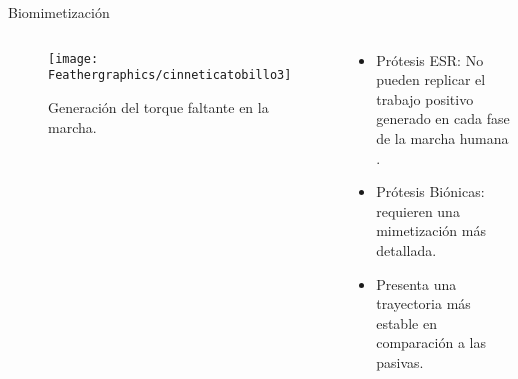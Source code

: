 \documentclass[10pt]{beamer}
\begin{document}
\begin{frame}{Biomimetización}

\begin{columns}[t]


\column{65 mm}
\begin{block}{}
{\footnotesize{}}

\begin{figure}
\begin{centering}
\texttt{[image: Feathergraphics/cinneticatobillo3]}
\par\end{centering}
\caption{{\scriptsize{}Generación del torque faltante en la marcha. \cite{Au2009} }}
\end{figure}

\end{block}

\column{50 mm}
\begin{exampleblock}{}

\begin{itemize}
\item {\footnotesize{}Prótesis ESR: No pueden replicar el trabajo positivo
generado en cada fase de la marcha humana \cite{Esposito2015}.}{\footnotesize \par}
\end{itemize}
\vspace{2 mm}
\begin{itemize}
\item {\footnotesize{}Prótesis Biónicas: requieren una mimetización más
detallada\cite{Hill2013a}.}{\footnotesize \par}
\end{itemize}
\vspace{2 mm}
\begin{itemize}
\item {\footnotesize{}Presenta una trayectoria más estable en comparación
a las pasivas\cite{Hill2013a}.}{\footnotesize \par}
\end{itemize}
\end{exampleblock}
\end{columns}

\end{frame}
\end{document}
